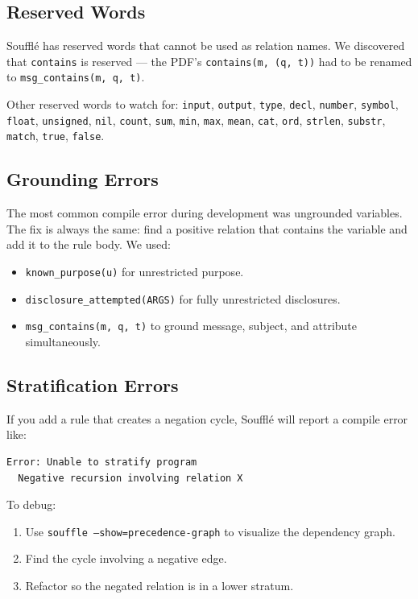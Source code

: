 \documentclass[11pt,letterpaper]{article}
\begin{document}
\subsection{Reserved Words}

Souffl\'{e} has reserved words that cannot be used as relation names. We discovered that \texttt{contains} is reserved --- the PDF's \texttt{contains(m, (q, t))} had to be renamed to \texttt{msg\_contains(m, q, t)}.

Other reserved words to watch for: \texttt{input}, \texttt{output}, \texttt{type}, \texttt{decl}, \texttt{number}, \texttt{symbol}, \texttt{float}, \texttt{unsigned}, \texttt{nil}, \texttt{count}, \texttt{sum}, \texttt{min}, \texttt{max}, \texttt{mean}, \texttt{cat}, \texttt{ord}, \texttt{strlen}, \texttt{substr}, \texttt{match}, \texttt{true}, \texttt{false}.

\subsection{Grounding Errors}

The most common compile error during development was ungrounded variables. The fix is always the same: find a positive relation that contains the variable and add it to the rule body. We used:
\begin{itemize}
  \item \texttt{known\_purpose(u)} for unrestricted purpose.
  \item \texttt{disclosure\_attempted(ARGS)} for fully unrestricted disclosures.
  \item \texttt{msg\_contains(m, q, t)} to ground message, subject, and attribute simultaneously.
\end{itemize}

\subsection{Stratification Errors}

If you add a rule that creates a negation cycle, Souffl\'{e} will report a compile error like:
\begin{verbatim}
Error: Unable to stratify program
  Negative recursion involving relation X
\end{verbatim}

To debug:
\begin{enumerate}
  \item Use \texttt{souffle --show=precedence-graph} to visualize the dependency graph.
  \item Find the cycle involving a negative edge.
  \item Refactor so the negated relation is in a lower stratum.
\end{enumerate}
\end{document}
